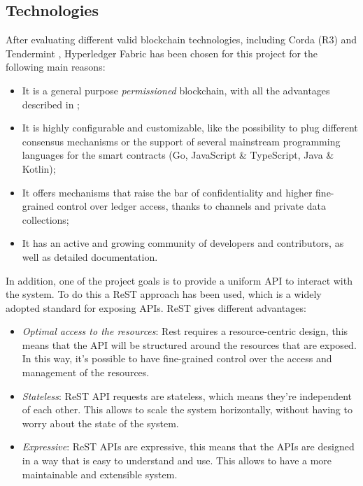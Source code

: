 \documentclass{scrartcl}
\begin{document}
\fi


\subsection{Technologies}

\iffalse

After evaluating different valid blockchain technologies, including Corda (R3) \cite{corda} and Tendermint \cite{tendermint}, Hyperledger Fabric has been chosen for this project for the following main reasons:

\begin{itemize}
    \item It is a general purpose \textit{permissioned} blockchain, with all the advantages described in ;
    \item It is highly configurable and customizable, like the possibility to plug different consensus mechanisms or the support of several mainstream programming languages for the smart contracts (Go, JavaScript \& TypeScript, Java \& Kotlin);
    \item It offers mechanisms that raise the bar of confidentiality and higher fine-grained control over ledger access, thanks to channels and private data collections;
    \item It has an active and growing community of developers and contributors, as well as detailed documentation.
\end{itemize}

In addition, one of the project goals is to provide a uniform API to interact with the system. 
%
To do this a ReST approach has been used, which is a widely adopted standard for exposing APIs. 
%
ReST gives different advantages:

\begin{itemize}
    \item \emph{Optimal access to the resources}: Rest requires a resource-centric design, this means that the API will be structured around the resources that are exposed. In this way, it's possible to have fine-grained control over the access and management of the resources.
    \item \emph{Stateless}: ReST API requests are stateless, which means they're independent of each other. This allows to scale the system horizontally, without having to worry about the state of the system.
    \item \emph{Expressive}: ReST APIs are expressive, this means that the APIs are designed in a way that is easy to understand and use. This allows to have a more maintainable and extensible system.
\end{itemize}
\end{document}
